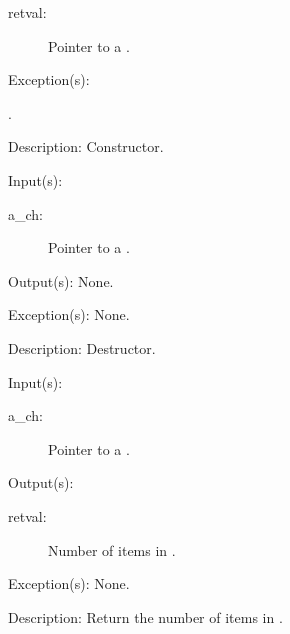 \begin{capi}
\begin{capilist}
		\begin{description}\item[]
		\item[retval: ]
			Pointer to a .
		\end{description}
	\item[Exception(s): ]
		\begin{description}\item[]
		\item[.]
		\end{description}
	\item[Description: ]
		Constructor.
	\end{capilist}
\label{ch_delete}
	\begin{capilist}
	\item[Input(s): ]
		\begin{description}\item[]
		\item[a\_ch: ]
			Pointer to a .
		\end{description}
	\item[Output(s): ] None.
	\item[Exception(s): ] None.
	\item[Description: ]
		Destructor.
	\end{capilist}
\label{ch_count}
	\begin{capilist}
	\item[Input(s): ]
		\begin{description}\item[]
		\item[a\_ch: ]
			Pointer to a \classname{ch}.
		\end{description}
	\item[Output(s): ]
		\begin{description}\item[]
		\item[retval: ]
			Number of items in \cvar{a\_ch}.
		\end{description}
	\item[Exception(s): ] None.
	\item[Description: ]
		Return the number of items in \cvar{a\_ch}.
	\end{capilist}
\label{ch_insert}
\end{capi}
